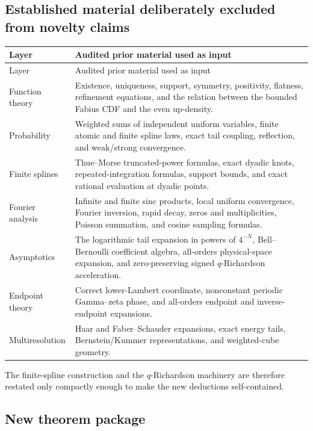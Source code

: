 \documentclass[11pt,oneside]{article}
\numberwithin{equation}{section}
\theoremstyle{definition}
\theoremstyle{remark}
\begin{document}
\subsection{Established material deliberately excluded from novelty claims}

\begin{longtable}{@{}>{\raggedright\arraybackslash}p{}>{\raggedright\arraybackslash}p{}@{}}
\toprule
Layer & Audited prior material used as input \\
\midrule
\endfirsthead
\toprule
Layer & Audited prior material used as input \\
\midrule
\endhead
Function theory & Existence, uniqueness, support, symmetry, positivity, flatness, refinement equations, and the relation between the bounded Fabius CDF and the even up-density.\\
Probability & Weighted sums of independent uniform variables, finite atomic and finite spline laws, exact tail coupling, reflection, and weak/strong convergence.\\
Finite splines & Thue--Morse truncated-power formulas, exact dyadic knots, repeated-integration formulas, support bounds, and exact rational evaluation at dyadic points.\\
Fourier analysis & Infinite and finite sinc products, local uniform convergence, Fourier inversion, rapid decay, zeros and multiplicities, Poisson summation, and cosine sampling formulas.\\
Asymptotics & The logarithmic tail expansion in powers of $4^{-N}$, Bell--Bernoulli coefficient algebra, all-orders physical-space expansion, and zero-preserving signed $q$-Richardson acceleration.\\
Endpoint theory & Correct lower-Lambert coordinate, nonconstant periodic Gamma--zeta phase, and all-orders endpoint and inverse-endpoint expansions.\\
Multiresolution & Haar and Faber--Schauder expansions, exact energy tails, Bernstein/Kummer representations, and weighted-cube geometry.\\
\bottomrule
\end{longtable}

The finite-spline construction and the $q$-Richardson machinery are therefore restated only compactly enough to make the new deductions self-contained.

\subsection{New theorem package}
\end{document}
